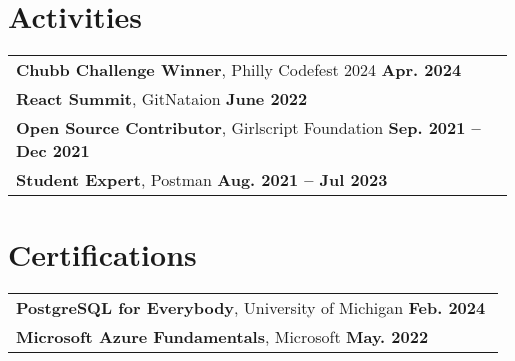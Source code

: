 \documentclass[letterpaper,11pt]{article}
\begin{document}
\section{Activities}
\begin{tabular}{p{0.99\linewidth}}
    \hspace{0.15in}\textbf{Chubb Challenge Winner}, Philly Codefest 2024
        \hfill \textbf{Apr. 2024} \\
            \hspace{0.15in}\textbf{React Summit}, GitNataion
        \hfill \textbf{June 2022}\\
    \hspace{0.15in}\textbf{Open Source Contributor}, Girlscript Foundation
        \hfill \textbf{Sep. 2021 -- Dec 2021}\\

    \hspace{0.15in}\textbf{Student Expert}, Postman
        \hfill \textbf{Aug. 2021 -- Jul 2023} 
    
\end{tabular}
\vspace{-23pt}

\section{Certifications}
\begin{tabular}{p{0.99\linewidth}}
    \hspace{0.15in}\textbf{PostgreSQL for Everybody}, University of Michigan
        \hfill \textbf{Feb. 2024} \\
    \hspace{0.15in}\textbf{Microsoft Azure Fundamentals}, Microsoft
        \hfill \textbf{May. 2022}\\
\end{tabular}
\end{document}
